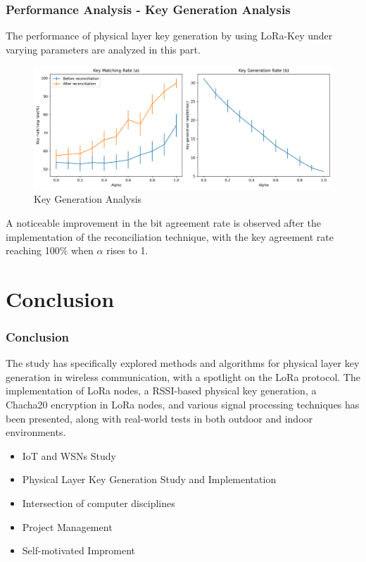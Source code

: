 \documentclass{beamer}
\begin{document}
\begin{frame}
  \frametitle{Performance Analysis -  Key Generation Analysis}

  The performance of physical layer key generation by using LoRa-Key under varying parameters are analyzed in this part.
  \begin{figure}
    \centering
    \includegraphics[width=0.8\linewidth]{../figures/keygenanalyst.png}
    \caption{Key Generation Analysis}
    \label{keygenanalyst}
  \end{figure}
A noticeable improvement in the bit agreement rate is observed after the implementation of the reconciliation technique, with the key agreement rate reaching 100$\%$ when \(\alpha\) rises to 1. 

\end{frame}

\section{Conclusion}

\begin{frame}
  \frametitle{Conclusion}
  The study has specifically explored methods and algorithms for physical layer key generation in wireless communication, with a spotlight on the LoRa protocol. The implementation of LoRa nodes, a RSSI-based physical key generation, a Chacha20 encryption in LoRa nodes, and various signal processing techniques has been presented, along with real-world tests in both outdoor and indoor environments.
\vspace{0.2in}
  \begin{itemize}
    \item IoT and WSNs Study
    \item Physical Layer Key Generation Study and Implementation
    \item Intersection of computer disciplines
    \item Project Management \footnotemark
    \item Self-motivated Improment
    \end{itemize}
\end{frame}
\end{document}
